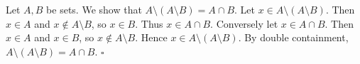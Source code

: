 Let $A, B$ be sets.
We show that $A \setminus (A \setminus B) = A \cap B$.
Let $x \in A \setminus (A \setminus B)$.
Then $x \in A$ and $x \notin A \setminus B$, so $x \in B$.
Thus $x \in A \cap B$.
Conversely let $x \in A \cap B$.
Then $x \in A$ and $x \in B$, so $x \notin A \setminus B$.
Hence $x \in A \setminus (A \setminus B)$.
By double containment, $A \setminus (A \setminus B) = A \cap B$. \hfill$\square$
